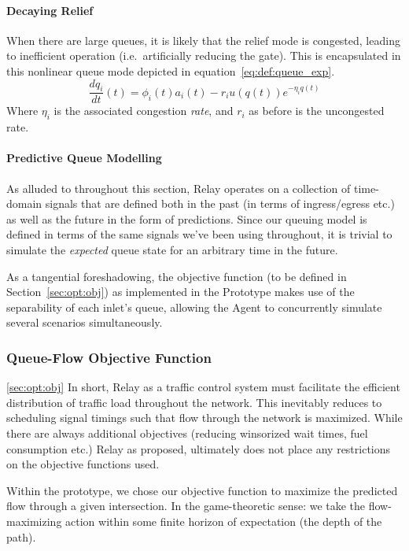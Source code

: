 \documentclass{report}
\begin{document}
\paragraph{Decaying Relief}
When there are large queues, it is likely that the relief mode is congested, leading to inefficient operation (i.e.\ artificially reducing the gate).
This is encapsulated in this nonlinear queue mode depicted in equation~\eqref{eq:def:queue_exp}.
\begin{equation}\label{eq:def:queue_exp}
	\frac{dq_i}{dt}(t) = \phi_i(t) a_i(t) - r_i u(q(t)) e^{-\eta_i q(t)}
\end{equation}
Where $\eta_i$ is the associated congestion \emph{rate}, and $r_i$ as before is the uncongested rate.

\paragraph{Predictive Queue Modelling}
As alluded to throughout this section, Relay operates on a collection of time-domain signals that are defined both in the past (in terms of ingress/egress etc.) as well as the future in the form of predictions.
Since our queuing model is defined in terms of the same signals we've been using throughout, it is trivial to simulate the \emph{expected} queue state for an arbitrary time in the future.

As a tangential foreshadowing, the objective function (to be defined in Section~\ref{sec:opt:obj}) as implemented in the Prototype makes use of the separability of each inlet's queue, allowing the Agent to concurrently simulate several scenarios simultaneously.

\subsubsection{Queue-Flow Objective Function}
\ref{sec:opt:obj}
In short, Relay as a traffic control system must facilitate the efficient distribution of traffic load throughout the network.
This inevitably reduces to scheduling signal timings such that flow through the network is maximized.
While there are always additional objectives (reducing winsorized wait times, fuel consumption etc.) Relay as proposed, ultimately does not place any restrictions on the objective functions used.

Within the prototype, we chose our objective function to maximize the predicted flow through a given intersection.
In the game-theoretic sense: we take the flow-maximizing action within some finite horizon of expectation (the depth of the path).
\end{document}
